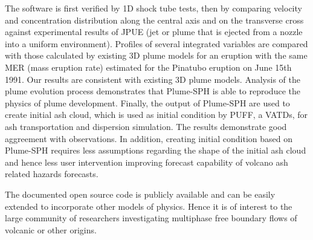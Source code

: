 The software is first verified by 1D shock tube tests, then by comparing velocity and concentration distribution along the central axis and on the transverse cross against experimental results of JPUE (jet or plume that is ejected from a nozzle into a uniform environment). 
Profiles of several integrated variables are compared with those calculated by existing 3D plume models for an eruption with the same MER (mass eruption rate) estimated for the Pinatubo eruption on June 15th 1991. Our results are consistent with existing 3D plume models. Analysis of the plume evolution process demonstrates that Plume-SPH is able to reproduce the physics of plume development. Finally, the output of Plume-SPH are used to create initial ash cloud, which is used as initial condition by PUFF, a VATDs, for ash transportation and dispersion simulation. The results demonstrate good aggreement with observations. In addition, creating initial condition based on Plume-SPH requires less assumptions regarding the shape of the initial ash cloud and hence less user intervention improving forecast capability of volcano ash related hazards forecasts.

The documented open source code is publicly available and can be easily extended to incorporate other models of physics. Hence it is of interest to the large community of researchers investigating multiphase free boundary flows of volcanic or other origins.